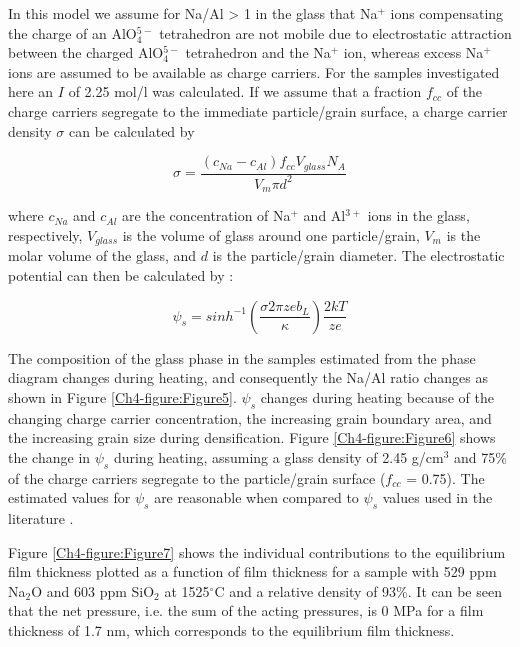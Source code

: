 In this model we assume for Na/Al > 1 in the glass that Na$^{+}$ ions compensating the charge of an AlO$_{4}^{5-}$ tetrahedron are not mobile due to electrostatic attraction between the charged AlO$_{4}^{5-}$ tetrahedron and the Na$^{+}$ ion, whereas excess Na$^{+}$ ions are assumed to be available as charge carriers. For the samples investigated here an $I$ of 2.25 mol/l was calculated. If we assume that a fraction $f_{cc}$ of the charge carriers segregate to the immediate particle/grain surface, a charge carrier density $\sigma$ can be calculated by

\begin{equation}
\label{Ch4-eq: eq11}
\sigma = \frac{\left( c_{Na} - c_{Al} \right) f_{cc} V_{glass} N_{A}}{V_{m} \pi d^{2}}
\end{equation}

\noindent where $c_{Na}$ and $c_{Al}$ are the concentration of Na$^{+}$ and Al$^{3+}$ ions in the glass, respectively, $V_{glass}$ is the volume of glass around one particle/grain, $V_{m}$ is the molar volume of the glass, and $d$ is the particle/grain diameter. The electrostatic potential can then be calculated by \cite{Clarke1993}:

\begin{equation}
\label{Ch4-eq: eq12}
\psi_{s} = sinh^{-1} \left( \frac{\sigma 2 \pi z e b_{L}}{\kappa} \right) \frac{2kT}{ze}
\end{equation}

The composition of the glass phase in the samples estimated from the phase diagram changes during heating, and consequently the Na/Al ratio changes as shown in Figure \ref{Ch4-figure:Figure5}. $\psi_{s}$ changes during heating because of the changing charge carrier concentration, the increasing grain boundary area, and the increasing grain size during densification. Figure \ref{Ch4-figure:Figure6} shows the change in $\psi_{s}$ during heating, assuming a glass density of 2.45 g/cm$^{3}$ and 75\% of the charge carriers segregate to the particle/grain surface ($f_{cc}$ = 0.75). The estimated values for $\psi_{s}$ are reasonable when compared to $\psi_{s}$ values used in the literature \cite{Clarke1993}.

Figure \ref{Ch4-figure:Figure7} shows the individual contributions to the equilibrium film thickness plotted as a function of film thickness for a sample with 529 ppm Na$_{2}$O and 603 ppm SiO$_{2}$ at 1525$^{\circ}$C and a relative density of 93\%. It can be seen that the net pressure, i.e. the sum of the acting pressures, is 0 MPa for a film thickness of 1.7 nm, which corresponds to the equilibrium film thickness. 

